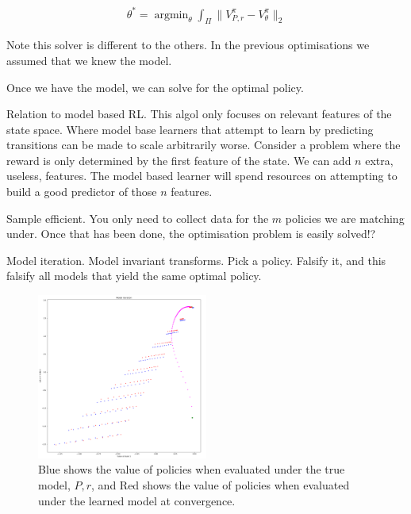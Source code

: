 \begin{align}
\theta^{* } = \mathop{\text{argmin}}_{\theta} \int_{\Pi} \parallel V^{\pi}_{P, r} -V^{\pi}_{\theta} \parallel_2
\end{align}

Note this solver is different to the others. In the previous optimisations we assumed that we knew the model.


Once we have the model, we can solve for the optimal policy.

Relation to model based RL. This algol only focuses on relevant features of the state space.
Where model base learners that attempt to learn by predicting transitions can be made to scale arbitrarily worse.
Consider a problem where the reward is only determined by the first feature of the state. We can add $n$ extra, useless, features.
The model based learner will spend resources on attempting to build a good predictor of those $n$ features.

Sample efficient. You only need to collect data for the $m$ policies we are matching under.
Once that has been done, the optimisation problem is easily solved!?

Model iteration. Model invariant transforms. Pick a policy. Falsify it,
and this falsify all models that yield the same optimal policy.

\begin{figure}
\centering
\includegraphics[width=0.5\textwidth,height=0.5\textheight]{../../pictures/figures/model_iteration.png}
\caption{Blue shows the value of policies when evaluated under the true model, $P, r$,
and Red shows the value of policies when evaluated under the learned model at convergence.}
\end{figure}

